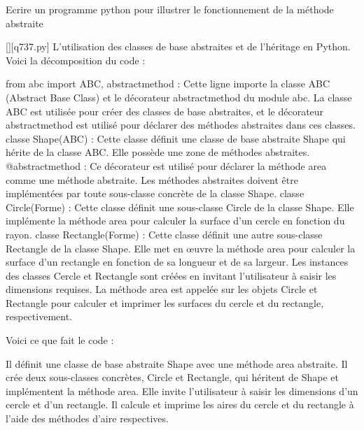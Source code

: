         \question
        Ecrire un programme python pour illustrer le fonctionnement de la méthode abstraite
        \par
        \begin{solution}
            \renewcommand{\nomfichier}{q737.py}
            \pythonfile{\chemincode \nomfichier}[][\nomfichier]
            L'utilisation des classes de base abstraites et de l'héritage en Python. Voici la décomposition du code :

    from abc import ABC, abstractmethod : Cette ligne importe la classe ABC (Abstract Base Class) et le décorateur abstractmethod du module abc. La classe ABC est utilisée pour créer des classes de base abstraites, et le décorateur abstractmethod est utilisé pour déclarer des méthodes abstraites dans ces classes.
    classe Shape(ABC) : Cette classe définit une classe de base abstraite Shape qui hérite de la classe ABC. Elle possède une zone de méthodes abstraites.
    @abstractmethod : Ce décorateur est utilisé pour déclarer la méthode area comme une méthode abstraite. Les méthodes abstraites doivent être implémentées par toute sous-classe concrète de la classe Shape.
    classe Circle(Forme) : Cette classe définit une sous-classe Circle de la classe Shape. Elle implémente la méthode area pour calculer la surface d'un cercle en fonction du rayon.
    classe Rectangle(Forme) : Cette classe définit une autre sous-classe Rectangle de la classe Shape. Elle met en œuvre la méthode area pour calculer la surface d'un rectangle en fonction de sa longueur et de sa largeur.
    Les instances des classes Cercle et Rectangle sont créées en invitant l'utilisateur à saisir les dimensions requises.
    La méthode area est appelée sur les objets Circle et Rectangle pour calculer et imprimer les surfaces du cercle et du rectangle, respectivement.

Voici ce que fait le code :

    Il définit une classe de base abstraite Shape avec une méthode area abstraite.
    Il crée deux sous-classes concrètes, Circle et Rectangle, qui héritent de Shape et implémentent la méthode area.
    Elle invite l'utilisateur à saisir les dimensions d'un cercle et d'un rectangle.
    Il calcule et imprime les aires du cercle et du rectangle à l'aide des méthodes d'aire respectives.
        \end{solution}
        

